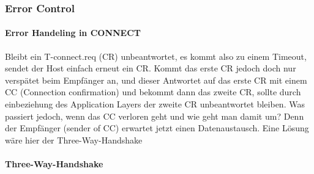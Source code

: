 		\subsubsection{Error Control}
			\paragraph{Error Handeling in CONNECT}
				Bleibt ein T-connect.req (CR) unbeantwortet, es kommt also zu einem Timeout, sendet der Host einfach erneut ein CR. Kommt das erste CR jedoch doch nur verspätet beim Empfänger an, und dieser Antwortet auf das erste CR mit einem CC (Connection confirmation) und bekommt dann das zweite CR, sollte durch einbeziehung des Application Layers der zweite CR unbeantwortet bleiben. Was passiert jedoch, wenn das CC verloren geht und wie geht man damit um? Denn der Empfänger (sender of CC) erwartet jetzt einen Datenaustausch. Eine Lösung wäre hier der Three-Way-Handshake

			\paragraph{Three-Way-Handshake}
				
				